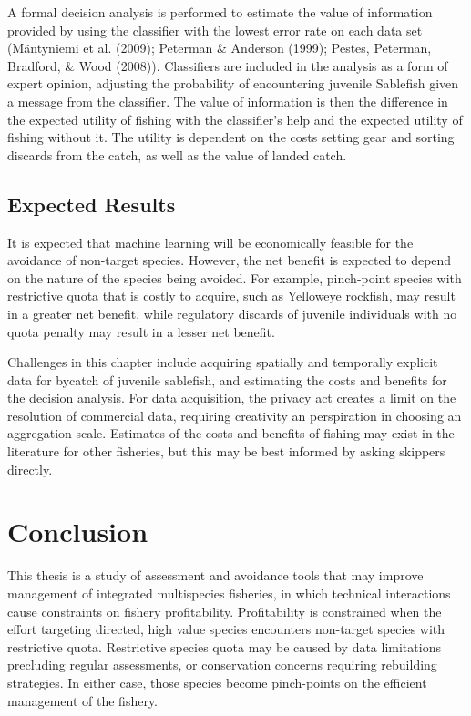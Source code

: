 \documentclass[12pt,]{scrartcl}
\begin{document}
A formal decision analysis is performed to estimate the value of
information provided by using the classifier with the lowest error rate
on each data set (Mäntyniemi et al. (2009); Peterman \& Anderson (1999);
Pestes, Peterman, Bradford, \& Wood (2008)). Classifiers are included in
the analysis as a form of expert opinion, adjusting the probability of
encountering juvenile Sablefish given a message from the classifier. The
value of information is then the difference in the expected utility of
fishing with the classifier's help and the expected utility of fishing
without it. The utility is dependent on the costs setting gear and
sorting discards from the catch, as well as the value of landed catch.

\subsection{Expected Results}\label{expected-results-3}

It is expected that machine learning will be economically feasible for
the avoidance of non-target species. However, the net benefit is
expected to depend on the nature of the species being avoided. For
example, pinch-point species with restrictive quota that is costly to
acquire, such as Yelloweye rockfish, may result in a greater net
benefit, while regulatory discards of juvenile individuals with no quota
penalty may result in a lesser net benefit.

Challenges in this chapter include acquiring spatially and temporally
explicit data for bycatch of juvenile sablefish, and estimating the
costs and benefits for the decision analysis. For data acquisition, the
privacy act creates a limit on the resolution of commercial data,
requiring creativity an perspiration in choosing an aggregation scale.
Estimates of the costs and benefits of fishing may exist in the
literature for other fisheries, but this may be best informed by asking
skippers directly.

\section{Conclusion}\label{conclusion}

This thesis is a study of assessment and avoidance tools that may
improve management of integrated multispecies fisheries, in which
technical interactions cause constraints on fishery profitability.
Profitability is constrained when the effort targeting directed, high
value species encounters non-target species with restrictive quota.
Restrictive species quota may be caused by data limitations precluding
regular assessments, or conservation concerns requiring rebuilding
strategies. In either case, those species become pinch-points on the
efficient management of the fishery.
\end{document}
